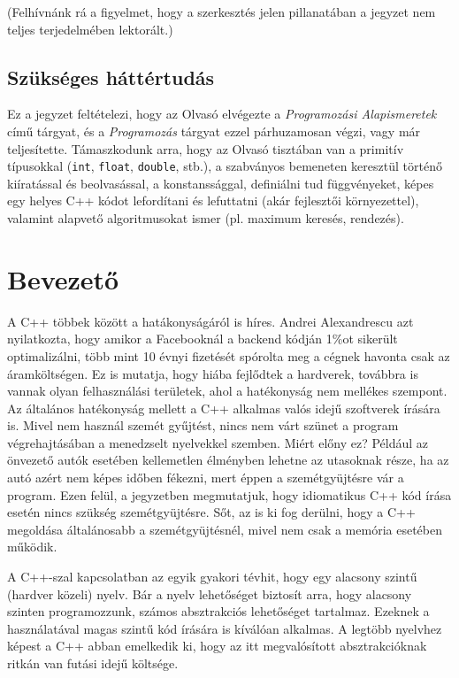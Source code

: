 \documentclass[a4paper,11.5pt,table]{article}
\begin{document}
	(Felhívnánk rá a figyelmet, hogy a szerkesztés jelen pillanatában a jegyzet nem teljes terjedelmében lektorált.)

	\subsection{Szükséges háttértudás}
	Ez a jegyzet feltételezi, hogy az Olvasó elvégezte a \emph{Programozási Alapismeretek} című tárgyat, és a \emph{Programozás} tárgyat ezzel párhuzamosan végzi, vagy már teljesítette. Támaszkodunk arra, hogy az Olvasó tisztában van a primitív típusokkal (\texttt{int}, \texttt{float}, \texttt{double}, stb.), a szabványos bemeneten keresztül történő kiíratással és beolvasással, a konstanssággal, definiálni tud függvényeket, képes egy helyes C++ kódot lefordítani és lefuttatni (akár fejlesztői környezettel), valamint alapvető algoritmusokat ismer (pl. maximum keresés, rendezés).

	\section{Bevezető}
	A C++ többek között a hatákonyságáról is híres. Andrei Alexandrescu azt nyilatkozta, hogy amikor a Facebooknál a backend kódján 1\%ot sikerült optimalizálni, több mint 10 évnyi fizetését spórolta meg a cégnek havonta csak az áramköltségen. Ez is mutatja, hogy hiába fejlődtek a hardverek, továbbra is vannak olyan felhasználási területek, ahol a hatékonyság nem mellékes szempont. Az általános hatékonyság mellett a C++ alkalmas valós idejű szoftverek írására is. Mivel nem használ szemét gyűjtést, nincs nem várt szünet a program végrehajtásában a menedzselt nyelvekkel szemben. Miért előny ez? Például az önvezető autók esetében kellemetlen élményben lehetne az utasoknak része, ha az autó azért nem képes időben fékezni, mert éppen a szemétgyüjtésre vár a program. Ezen felül, a jegyzetben megmutatjuk, hogy idiomatikus C++ kód írása esetén nincs szükség szemétgyüjtésre. Sőt, az is ki fog derülni, hogy a C++ megoldása általánosabb a szemétgyüjtésnél, mivel nem csak a memória esetében működik.

	A C++-szal kapcsolatban az egyik gyakori tévhit, hogy egy alacsony szintű (hardver közeli) nyelv. Bár a nyelv lehetőséget biztosít arra, hogy alacsony szinten programozzunk, számos absztrakciós lehetőséget tartalmaz. Ezeknek a használatával magas szintű kód írására is kíválóan alkalmas. A legtöbb nyelvhez képest a C++ abban emelkedik ki, hogy az itt megvalósított absztrakcióknak ritkán van futási idejű költsége.
	
\end{document}
